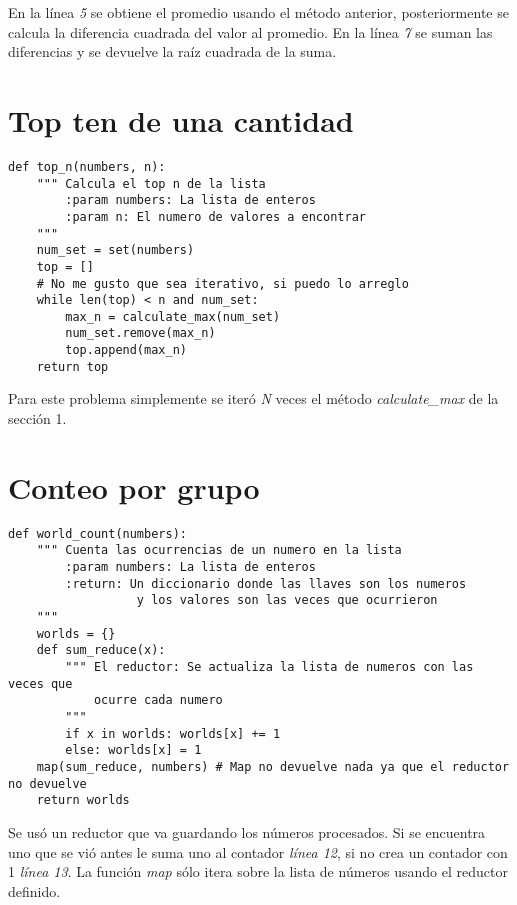 \documentclass[12pt]{article}
\begin{document}
En la línea \textit{5} se obtiene el promedio usando el método anterior, posteriormente se calcula la diferencia cuadrada del valor al promedio. En la línea \textit{7} se suman las diferencias y se devuelve la raíz cuadrada de la suma.

\section{Top ten de una cantidad}
\begin{verbatim}
def top_n(numbers, n):
    """ Calcula el top n de la lista
        :param numbers: La lista de enteros
        :param n: El numero de valores a encontrar
    """
    num_set = set(numbers)
    top = []
    # No me gusto que sea iterativo, si puedo lo arreglo
    while len(top) < n and num_set:
        max_n = calculate_max(num_set)
        num_set.remove(max_n)
        top.append(max_n)
    return top
\end{verbatim}

Para este problema simplemente se iteró \textit{N} veces el método \textit{calculate\_max} de la sección 1.


\section{Conteo por grupo}
\begin{verbatim}
def world_count(numbers):
    """ Cuenta las ocurrencias de un numero en la lista
        :param numbers: La lista de enteros
        :return: Un diccionario donde las llaves son los numeros
                  y los valores son las veces que ocurrieron
    """
    worlds = {}
    def sum_reduce(x):
        """ El reductor: Se actualiza la lista de numeros con las veces que 
            ocurre cada numero
        """
        if x in worlds: worlds[x] += 1
        else: worlds[x] = 1
    map(sum_reduce, numbers) # Map no devuelve nada ya que el reductor no devuelve 
    return worlds
\end{verbatim}


Se usó un reductor que va guardando los números procesados. Si se encuentra uno que se vió antes le suma uno al contador \textit{línea 12}, si no crea un contador con 1 \textit{línea 13}. La función \textit{map} sólo itera sobre la lista de números usando el reductor definido.
\end{document}
